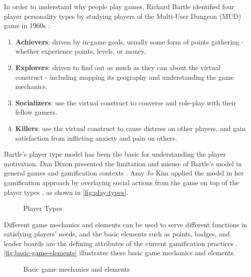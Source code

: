 In order to understand why people play games, Richard Bartle identified four player personality types by studying players of the Multi-User Dungeon (MUD) game in 1960s \cite {bartle1996hearts}:
\begin{enumerate}

\item \textbf{Achievers}: driven by in-game goals, usually some form of points gathering - whether experience points, levels, or money.

\item \textbf{Explorers}:  driven to find out as much as they can about the virtual construct - including mapping its geography and understanding the game mechanics.

\item \textbf{Socializers}: use the virtual construct to converse and role-play with their fellow gamers.

\item \textbf{Killers}: use the virtual construct to cause distress on other players, and gain satisfaction from inflicting anxiety and pain on others.

\end{enumerate}

Bartle's player type model has been the basic for understanding the player motivation. Dan Dixon presented the limitation and misuse of Bartle's model in general games and gamification contexts \cite{DixonPlayerType}. Amy Jo Kim applied the model in her gamification approach by overlaying social actions from the game on top of the player types \cite {Kim2010}, as shown in \autoref{fig:play-types}.

\begin{figure}[ht!]
	\centering
		\caption{Player Types}
		\label{fig:play-types}
\end{figure}

Different game mechanics and elements can be used to serve different functions in satisfying players' needs, and the basic elements such as points, badges, and leader boards are the defining attributes of the current gamification practices \cite {Deterding2011dragon}. \autoref{fig:basic-game-elements}  illustrates these basic game mechanics and elements.

\begin{figure}[ht!]
	\centering
		\caption{Basic game mechanics and elements}
		\label{fig:basic-game-elements}
\end{figure}

